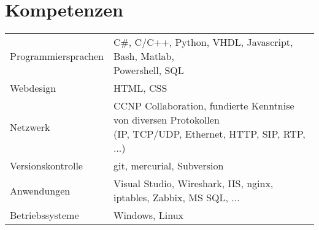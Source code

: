 \section*{Kompetenzen}
\begin{tabularx}{\textwidth}{b{4cm}|l}
Programmiersprachen & \makecell[cl]{C\#, C/C++, Python, VHDL, Javascript, Bash, Matlab, \\ Powershell, SQL} \\
Webdesign & HTML, CSS \\
Netzwerk & \makecell[cl]{CCNP Collaboration, fundierte Kenntnise von diversen Protokollen \\ (IP, TCP/UDP, Ethernet, HTTP, SIP, RTP, ...)} \\
Versionskontrolle & git, mercurial, Subversion \\
Anwendungen & Visual Studio, Wireshark, IIS, nginx, iptables, Zabbix, MS SQL, ... \\
Betriebssysteme & Windows, Linux
\end{tabularx}

